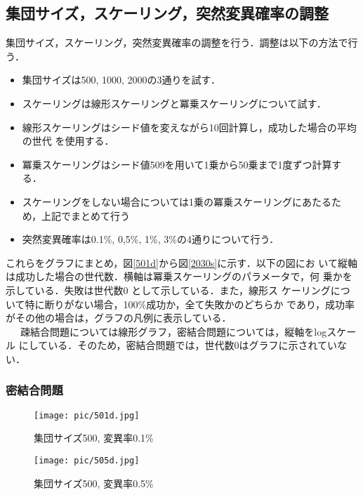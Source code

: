 \documentclass[a4j]{jarticle}
\begin{document}
\subsection*{集団サイズ，スケーリング，突然変異確率の調整}
集団サイズ，スケーリング，突然変異確率の調整を行う．調整は以下の方法で行
う．
\begin{itemize}
 \item 集団サイズは500, 1000, 2000の3通りを試す．
 \item スケーリングは線形スケーリングと冪乗スケーリングについて試す．
 \item 線形スケーリングはシード値を変えながら10回計算し，成功した場合の平均の世代
       を使用する．
 \item 冪乗スケーリングはシード値509を用いて1乗から50乗まで1度ずつ計算す
       る．
 \item スケーリングをしない場合については1乗の冪乗スケーリングにあたるた
       め，上記でまとめて行う
 \item 突然変異確率は0.1\%, 0,5\%, 1\%, 3\%の4通りについて行う．
\end{itemize}
これらをグラフにまとめ，図\ref{501d}から図\ref{2030s}に示す．以下の図にお
いて縦軸は成功した場合の世代数．横軸は冪乗スケーリングのパラメータで，何
乗かを示している．失敗は世代数0
として示している．また，線形ス
ケーリングについて特に断りがない場合，100\%成功か，全て失敗かのどちらか
であり，成功率がその他の場合は，グラフの凡例に表示している．\\\ \ \ 
疎結合問題については線形グラフ，密結合問題については，縦軸をlogスケール
にしている．そのため，密結合問題では，世代数0はグラフに示されていない．


\subsubsection*{密結合問題}
\begin{figure}[htb]
 \begin{minipage}{0.5\hsize}
  \begin{center}
  \texttt{[image: pic/501d.jpg]}
  \end{center}
  \caption{集団サイズ500, 変異率0.1\%}
  \label{501d}
 \end{minipage}
 \begin{minipage}{0.5\hsize}
  \begin{center}
  \texttt{[image: pic/505d.jpg]}
  \end{center}
  \caption{集団サイズ500, 変異率0.5\%}
  \label{505d}
 \end{minipage}
\end{figure}
\end{document}
